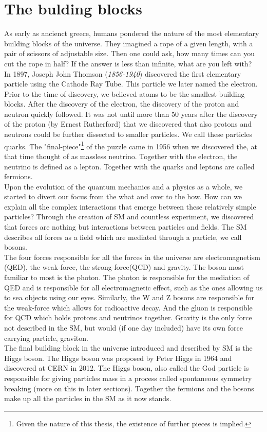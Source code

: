 \section{The bulding blocks}
As early as ancienct greece, humans pondered the nature of the most elementary building blocks of
the universe. They imagined a rope of a given length, with a pair of scissors of adjustable size.
Then one could ask, how many times can you cut the rope in half? If the answer is less than infinite,
what are you left with?
\\
In 1897, Joseph John Thomson (\emph{1856-1940}) discovered the first elementary particle using the Cathode Ray Tube. 
This particle we later named the electron. Prior to the time of discovery, we believed atoms to 
be the smallest building blocks. After the discovery of the electron, the discovery of the 
proton and neutron quickly followed. It was not until more than 50 years after the discovery of 
the proton (by Ernest Rutherford) that we discovered that also protons and neutrons could be further
dissected to smaller particles. We call these particles quarks. The "final-piece"\footnote{Given the
nature of this thesis, the existence of further pieces is implied.} of the puzzle came
in 1956 when we discovered the, at that time thought of as massless neutrino. Together
with the electron, the neutrino is defined as a lepton. Together with the quarks and leptons
are called fermions.
\\
Upon the evolution of the quantum mechanics and a physics as a whole, we started to divert
our focus from the what and over to the how. How can we explain all the complex interactions
that emerge between these relatively simple particles? Through the creation of \ac{SM} and countless 
experiment, we discovered that forces are nothing but interactions between particles and fields.
The \ac{SM} describes all forces as a field which are mediated through a particle, we call bosons. 
\\
The four forces responsible for all the forces in the universe are electromagnetism (\ac{QED}), the weak-force, the strong-force(\ac{QCD})
and gravity. The boson most familiar to most is the photon. The photon is responsible for the mediation 
of \ac{QED} and is responsible for all electromagnetic effect, such as the ones allowing
us to sea objects using our eyes. Similarly, the W and Z bosons are responsible for the weak-force which
allows for radioactive decay. And the gluon is responsible for \ac{QCD} which holds protons and 
neutrinos together. Gravity is the only force not described in the SM, but would (if one day included)
have its own force carrying particle, graviton. 
\\
The final building block in the universe introduced and described by \ac{SM} is the Higgs boson.
The Higgs boson was proposed by Peter Higgs in 1964 and discovered at CERN in 2012. The Higgs boson,
also called the God particle is responsible for giving particles mass in a process called
spontaneous symmetry breaking (more on this in later sections). Together the fermions and the bosons
make up all the particles in the \ac{SM} as it now stands.
